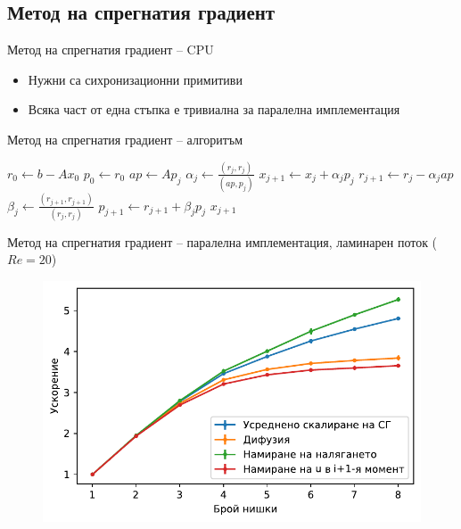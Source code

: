 \documentclass{beamer}
\begin{document}
\subsection{Метод на спрегнатия градиент}
\begin{frame}{Метод на спрегнатия градиент -- CPU}
	\begin{itemize}[<+->]
		\item Нужни са сихронизационни примитиви
		\item Всяка част от една стъпка е тривиална за паралелна имплементация
	\end{itemize}
\end{frame}
\begin{frame}{Метод на спрегнатия градиент -- алгоритъм}
\begin{algorithm}[H]
\centering
{}
\caption{Метод на спрегнатия градиент за решаване на $Ax=b$ с начално приближение $x_0$}
    \begin{algorithmic}[1]
			\State $r_0 \gets b - Ax_0$
			\State $p_0 \gets r_0$
				\State $ap \gets Ap_j$
				\State $\alpha_j \gets \frac{(r_j, r_j)}{(ap, p_j)}$
				\State $x_{j+1} \gets x_j + \alpha_j p_j$
				\State $r_{j+1} \gets r_j - \alpha_j ap$
				\State $\beta_j \gets \frac{(r_{j+1}, r_{j+1})}{(r_j, r_j)}$
				\State $p_{j+1} \gets r_{j+1} + \beta_j p_j$
			\EndFor
			\State \Return $x_{j+1}$
		\EndProcedure
    \end{algorithmic}
\end{algorithm}
\end{frame}
\begin{frame}{Метод на спрегнатия градиент -- паралелна имплементация, ламинарен поток ($Re = 20$)}
\begin{figure}[H]
            \includegraphics[width=\linewidth]{../../Figures/BG/LaminarCGSpeedUpC2.pdf}   
\end{figure}
\end{frame}
\end{document}
